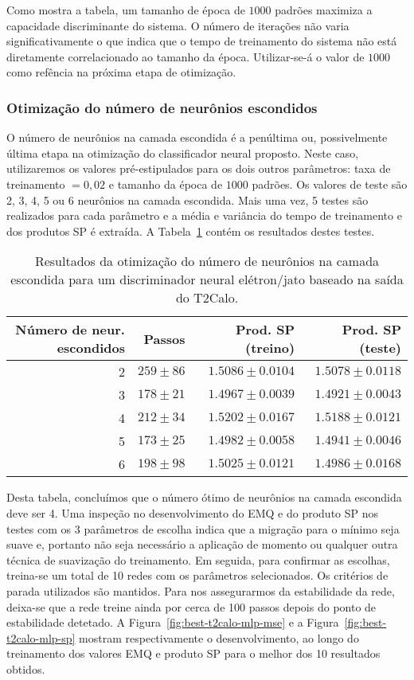 Como mostra a tabela, um tamanho de época de $1000$ padrões maximiza a
capacidade discriminante do sistema. O número de iterações não varia
significativamente o que indica que o tempo de treinamento do sistema não está
diretamente correlacionado ao tamanho da época. Utilizar-se-á o valor de
$1000$ como refência na próxima etapa de otimização.

\subsubsection{Otimização do número de neurônios escondidos}

O número de neurônios na camada escondida é a penúltima ou, possivelmente
última etapa na otimização do classificador neural proposto. Neste caso,
utilizaremos os valores pré-estipulados para os dois outros parâmetros: taxa
de treinamento $=0,02$ e tamanho da época de $1000$ padrões. Os valores de
teste são 2, 3, 4, 5 ou 6 neurônios na camada escondida. Mais uma vez, 5
testes são realizados para cada parâmetro e a média e variância do tempo de
treinamento e dos produtos SP é extraída. A
Tabela~\ref{tab:t2calo-neural-hidden-scan} contém os resultados destes testes.

\begin{table}
\caption{Resultados da otimização do número de neurônios na camada escondida
para um discriminador neural elétron/jato baseado na saída do T2Calo.}
\label{tab:t2calo-neural-hidden-scan}
\begin{center}
\begin{tabular}{|r|r|r|r|} \hline
Número de neur. escondidos & Passos & Prod. SP (treino) &
Prod. SP (teste) \\ \hline 
2 & $259\pm86$ & $1.5086\pm0.0104$ & $1.5078\pm0.0118$ \\ \hline
3 & $178\pm21$ & $1.4967\pm0.0039$ & $1.4921\pm0.0043$ \\ \hline
4 & $212\pm34$ & $1.5202\pm0.0167$ & $1.5188\pm0.0121$ \\ \hline
5 & $173\pm25$ & $1.4982\pm0.0058$ & $1.4941\pm0.0046$ \\ \hline
6 & $198\pm98$ & $1.5025\pm0.0121$ & $1.4986\pm0.0168$ \\ \hline
\end{tabular}
\end{center}
\end{table}

Desta tabela, concluímos que o número ótimo de neurônios na camada escondida
deve ser 4. Uma inspeção no desenvolvimento do EMQ e do produto SP nos testes
com os 3 parâmetros de escolha indica que a migração para o mínimo seja suave
e, portanto não seja necessário a aplicação de momento ou qualquer outra
técnica de suavização do treinamento. Em seguida, para confirmar as escolhas,
treina-se um total de 10 redes com os parâmetros selecionados. Os critérios de
parada utilizados são mantidos. Para nos assegurarmos da estabilidade da rede,
deixa-se que a rede treine ainda por cerca de 100 passos depois do ponto de
estabilidade detetado. A Figura~\ref{fig:best-t2calo-mlp-mse} e a
Figura~\ref{fig:best-t2calo-mlp-sp} mostram respectivamente o desenvolvimento,
ao longo do treinamento dos valores EMQ e produto SP para o melhor dos 10
resultados obtidos.

